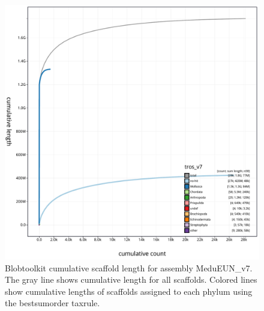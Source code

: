 \documentclass[11pt, a4paper]{article}
\begin{document}
\begin{figure}
	\includegraphics[width=\linewidth]{figures/btk_cumulative_MeduEUN_v7}
	\caption{Blobtoolkit cumulative scaffold length for assembly MeduEUN\_v7. The gray line shows cumulative length for all scaffolds. Colored lines show cumulative lengths of scaffolds assigned to each phylum using the bestsumorder taxrule.}
	\label{supfig:btk-cumul-MeduEUN}
\end{figure}
\end{document}
